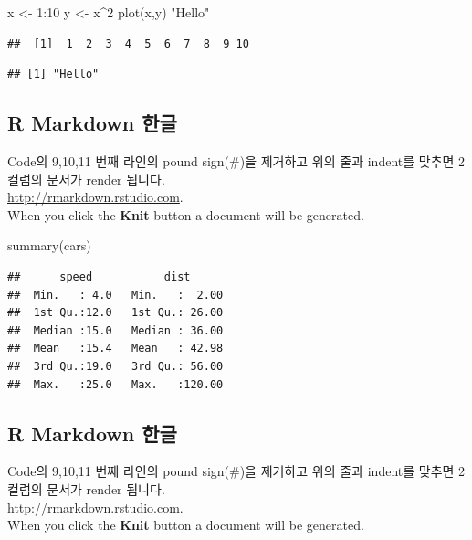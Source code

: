 \documentclass[twocolumn]{article}
\newenvironment{Shaded}{}{}
\newcommand{\KeywordTok}[1]{\textcolor[rgb]{0.00,0.00,1.00}{#1}}
\newcommand{\DecValTok}[1]{#1}
\newcommand{\StringTok}[1]{\textcolor[rgb]{0.00,0.50,0.50}{#1}}
\newcommand{\OperatorTok}[1]{#1}
\newcommand{\NormalTok}[1]{#1}
\begin{document}
\hypertarget{numCode}{\label{numCode}}
\begin{Shaded}
\begin{Highlighting}[numbers=left,,]
\NormalTok{x <-}\StringTok{ }\DecValTok{1}\OperatorTok{:}\DecValTok{10}
\NormalTok{y <-}\StringTok{ }\NormalTok{x}\OperatorTok{^}\DecValTok{2}
\KeywordTok{plot}\NormalTok{(x,y)}
\StringTok{"Hello"}
\end{Highlighting}
\end{Shaded}

\begin{verbatim}
##  [1]  1  2  3  4  5  6  7  8  9 10
\end{verbatim}

\begin{verbatim}
## [1] "Hello"
\end{verbatim}

\subsection{R Markdown 한글}\label{r-markdown--1}

Code의 9,10,11 번째 라인의 pound sign(\#)을 제거하고 위의 줄과 indent를
맞추면 2 컬럼의 문서가 render 됩니다.\\
\url{http://rmarkdown.rstudio.com}.\\
When you click the \textbf{Knit} button a document will be generated.

\begin{Shaded}
\begin{Highlighting}[]
\KeywordTok{summary}\NormalTok{(cars)}
\end{Highlighting}
\end{Shaded}

\begin{verbatim}
##      speed           dist       
##  Min.   : 4.0   Min.   :  2.00  
##  1st Qu.:12.0   1st Qu.: 26.00  
##  Median :15.0   Median : 36.00  
##  Mean   :15.4   Mean   : 42.98  
##  3rd Qu.:19.0   3rd Qu.: 56.00  
##  Max.   :25.0   Max.   :120.00
\end{verbatim}

\subsection{R Markdown 한글}\label{r-markdown--2}

Code의 9,10,11 번째 라인의 pound sign(\#)을 제거하고 위의 줄과 indent를
맞추면 2 컬럼의 문서가 render 됩니다.\\
\url{http://rmarkdown.rstudio.com}.\\
When you click the \textbf{Knit} button a document will be generated.
\end{document}
